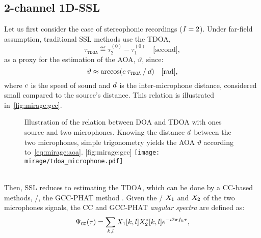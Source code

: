 \subsection{2-channel 1D-SSL}\label{subsec:mirage:1D-SSL}
\newcommand{\tdoa}{\ensuremath{\tau_\mathtt{TDOA}}}
\newcommand{\aoa}{\ensuremath{\vartheta}}
Let us first consider the case of stereophonic recordings ($I=2$).
Under far-field assumption, traditional \ac{SSL} methods use the \acf{TDOA},
\begin{equation*}
    \tdoa \eqdef \tau^{(0)}_2 - \tau^{(0)}_1\quad\text{[second]}
    ,
\end{equation*}
as a proxy for the estimation of the \ac{AOA}, $\aoa$, since:
\begin{equation}\label{eq:mirage:aoa}
    \vartheta \approx \arccos \kparen{\speedOfSound \: \tdoa \: / \: \distMicMic }\quad\text{[rad]},
\end{equation}
where $c$ is the speed of sound and $d$ is the inter-microphone distance, considered small compared to the source's distance.
This relation is illustrated in~\cref{fig:mirage:gcc}.
\begin{figure}
    \begin{sidecaption}[]{
        Illustration of the relation between \ac{DOA} and \ac{TDOA} with ones source and two microphones.
        Knowing the distance $d$ between the two microphones, simple trigonometry yields the \ac{AOA} $\vartheta$ according to~\cref{eq:mirage:aoa}.
    }[fig:mirage:gcc]
        \texttt{[image: mirage/tdoa\_microphone.pdf]}
    \end{sidecaption}
\end{figure}
\\Then, \ac{SSL} reduces to estimating the \ac{TDOA}, which can be done by a \ac{CC}-based methods, \eg/, the \acf{GCC-PHAT} method .
Given the \STFT/ $X_1$ and $X_2$ of the two microphones signals, the \ac{CC} and \ac{GCC-PHAT} \textit{angular spectra} are defined as:
\begin{equation}\label{eq:mirage:cc}
    \Psi_\mathtt{CC}(\tau) = \sum_{k,l} X_1[k,l] X_2^{*}[k,l] {e}^{-{i} 2  \pi f_k \tau}
    ,
    \end{equation}
